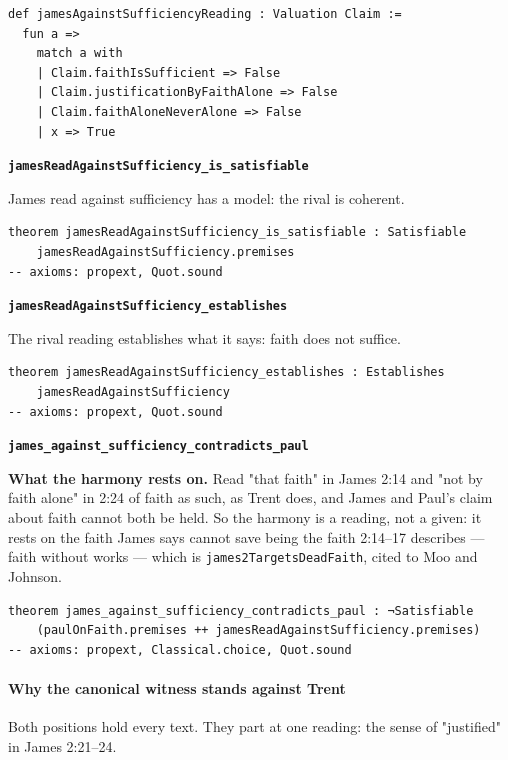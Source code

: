 \documentclass[11pt]{article}
\begin{document}
{\small\begin{verbatim}
def jamesAgainstSufficiencyReading : Valuation Claim :=
  fun a =>
    match a with
    | Claim.faithIsSufficient => False
    | Claim.justificationByFaithAlone => False
    | Claim.faithAloneNeverAlone => False
    | x => True
\end{verbatim}}
\par\medskip\noindent\textbf{\texttt{james\allowbreak{}Read\allowbreak{}Against\allowbreak{}Sufficiency\_\allowbreak{}is\_\allowbreak{}satisfiable}}\par\nobreak\noindent
James read against sufficiency has a model: the rival is coherent.

{\small\begin{verbatim}
theorem jamesReadAgainstSufficiency_is_satisfiable : Satisfiable
    jamesReadAgainstSufficiency.premises
-- axioms: propext, Quot.sound
\end{verbatim}}
\par\medskip\noindent\textbf{\texttt{james\allowbreak{}Read\allowbreak{}Against\allowbreak{}Sufficiency\_\allowbreak{}establishes}}\par\nobreak\noindent
The rival reading establishes what it says: faith does not suffice.

{\small\begin{verbatim}
theorem jamesReadAgainstSufficiency_establishes : Establishes
    jamesReadAgainstSufficiency
-- axioms: propext, Quot.sound
\end{verbatim}}
\par\medskip\noindent\textbf{\texttt{james\_\allowbreak{}against\_\allowbreak{}sufficiency\_\allowbreak{}contradicts\_\allowbreak{}paul}}\par\nobreak\noindent
\textbf{What the harmony rests on.} Read "that faith" in James 2:14 and "not by faith alone" in 2:24 of faith as such, as Trent does, and James and Paul's claim about faith cannot both be held. So the harmony is a reading, not a given: it rests on the faith James says cannot save being the faith 2:14–17 describes — faith without works — which is \texttt{james2\allowbreak{}Targets\allowbreak{}Dead\allowbreak{}Faith}, cited to Moo and Johnson.

{\small\begin{verbatim}
theorem james_against_sufficiency_contradicts_paul : ¬Satisfiable
    (paulOnFaith.premises ++ jamesReadAgainstSufficiency.premises)
-- axioms: propext, Classical.choice, Quot.sound
\end{verbatim}}
\paragraph*{Why the canonical witness stands against Trent}
\leavevmode\par
Both positions hold every text. They part at one reading: the sense of "justified" in James 2:21–24.
\end{document}
